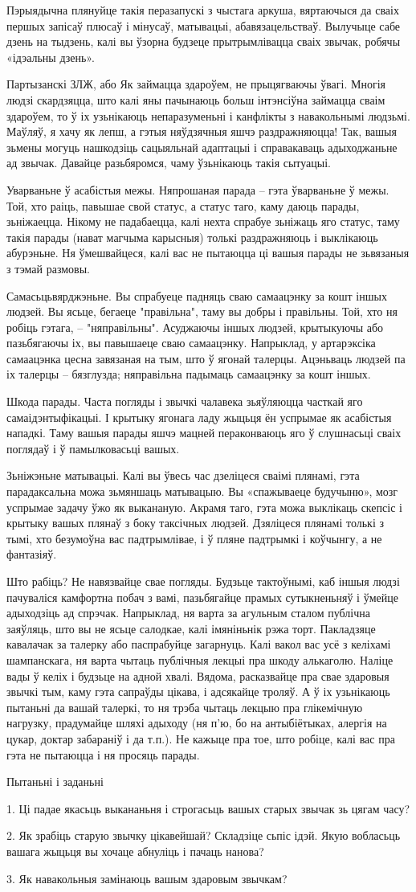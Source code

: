 Пэрыядычна плянуйце такія перазапускі з чыстага аркуша, вяртаючыся да сваіх першых запісаў плюсаў і мінусаў, матывацыі, абавязацельстваў. Вылучыце сабе дзень на тыдзень, калі вы ўзорна будзеце прытрымлівацца сваіх звычак, робячы «ідэальны дзень».

Партызанскі ЗЛЖ, або Як займацца здароўем, не прыцягваючы ўвагі. Многія людзі скардзяцца, што калі яны пачынаюць больш інтэнсіўна займацца сваім здароўем, то ў іх узьнікаюць непаразуменьні і канфлікты з навакольнымі людзьмі. Маўляў, я хачу як лепш, а гэтыя няўдзячныя яшчэ раздражняюцца! Так, вашыя зьмены могуць нашкодзіць сацыяльнай адаптацыі і справакаваць адыходжаньне ад звычак. Давайце разьбяромся, чаму ўзьнікаюць такія сытуацыі.

Уварваньне ў асабістыя межы. Няпрошаная парада – гэта ўварваньне ў межы. Той, хто раіць, павышае свой статус, а статус таго, каму даюць парады, зьніжаецца. Нікому не падабаецца, калі нехта спрабуе зьніжаць яго статус, таму такія парады (нават магчыма карысныя) толькі раздражняюць і выклікаюць абурэньне. Ня ўмешвайцеся, калі вас не пытаюцца ці вашыя парады не зьвязаныя з тэмай размовы.

Самасьцьвярджэньне. Вы спрабуеце падняць сваю самаацэнку за кошт іншых людзей. Вы ясьце, бегаеце "правільна", таму вы добры і правільны. Той, хто ня робіць гэтага, -- "няправільны". Асуджаючы іншых людзей, крытыкуючы або пазьбягаючы іх, вы павышаеце сваю самаацэнку. Напрыклад, у артарэксіка самаацэнка цесна завязаная на тым, што ў ягонай талерцы. Ацэньваць людзей па іх талерцы – бязглузда; няправільна падымаць самаацэнку за кошт іншых.

Шкода парады. Часта погляды і звычкі чалавека зьяўляюцца часткай яго самаідэнтыфікацыі. І крытыку ягонага ладу жыцьця ён успрымае як асабістыя нападкі. Таму вашыя парады яшчэ мацней пераконваюць яго ў слушнасьці сваіх поглядаў і ў памылковасьці вашых.

Зьніжэньне матывацыі. Калі вы ўвесь час дзеліцеся сваімі плянамі, гэта парадаксальна можа зьмяншаць матывацыю. Вы «спажываеце будучыню», мозг успрымае задачу ўжо як выкананую. Акрамя таго, гэта можа выклікаць скепсіс і крытыку вашых плянаў з боку таксічных людзей. Дзяліцеся плянамі толькі з тымі, хто безумоўна вас падтрымлівае, і ў пляне падтрымкі і коўчынгу, а не фантазіяў.

Што рабіць? Не навязвайце свае погляды. Будзьце тактоўнымі, каб іншыя людзі пачуваліся камфортна побач з вамі, пазьбягайце прамых сутыкненьняў і ўмейце адыходзіць ад спрэчак. Напрыклад, ня варта за агульным сталом публічна заяўляць, што вы не ясьце салодкае, калі імяніньнік рэжа торт. Пакладзяце кавалачак за талерку або паспрабуйце загарнуць. Калі вакол вас усё з келіхамі шампанскага, ня варта чытаць публічныя лекцыі пра шкоду алькаголю. Наліце вады ў келіх і будзьце на адной хвалі. Вядома, расказвайце пра свае здаровыя звычкі тым, каму гэта сапраўды цікава, і адсякайце троляў. А ў іх узьнікаюць пытаньні да вашай талеркі, то ня трэба чытаць лекцыю пра глікемічную нагрузку, прадумайце шляхі адыходу (ня п'ю, бо на антыбіётыках, алергія на цукар, доктар забараніў і да т.п.). Не кажыце пра тое, што робіце, калі вас пра гэта не пытаюцца і ня просяць парады.

Пытаньні і заданьні

1. Ці падае якасьць выкананьня і строгасьць вашых старых звычак зь цягам часу?

2. Як зрабіць старую звычку цікавейшай? Складзіце сьпіс ідэй. Якую вобласьць вашага жыцьця вы хочаце абнуліць і пачаць нанова?

3. Як навакольныя замінаюць вашым здаровым звычкам?
